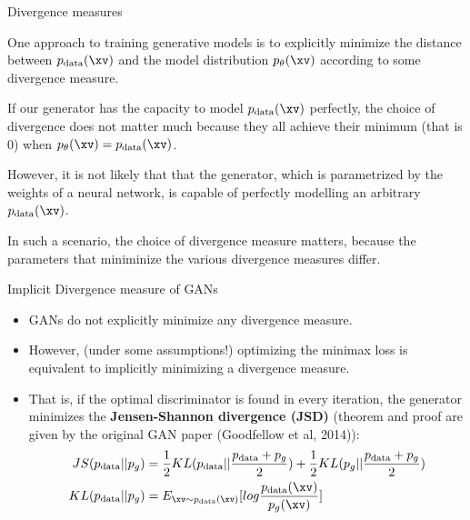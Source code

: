 \begin{frame} {Divergence measures}
  \begin{itemize}
    \small{\item One approach to training generative models is to explicitly minimize the distance between $p_{\text{data}}(\xv)$ and the model distribution $p_{\theta}(\xv)$ according to some divergence measure.
    \vspace{2mm}
    \item If our generator has the capacity to model $p_{\text{data}}(\xv)$ perfectly, the choice of divergence does not matter much because they all achieve their minimum (that is 0) when $p_{\theta}(\xv) = p_{\text{data}}(\xv)$.
    \vspace{2mm}
    \item However, it is not likely that that the generator, which is  parametrized by the weights of a neural network, is capable of perfectly modelling an arbitrary $ p_{\text{data}}(\xv)$.
    \vspace{2mm}
    \item In such a scenario, the choice of divergence measure matters, because the parameters that miniminize the various divergence measures differ.}
  \end{itemize}
\end{frame}

\begin{frame} {Implicit Divergence measure of GANs}
  \begin{itemize}
   \item GANs do not explicitly minimize any divergence measure.
   \item However, (under some assumptions!) optimizing the minimax loss is equivalent to implicitly minimizing a divergence measure.
    \item That is, if the optimal discriminator is found in every iteration,  the generator minimizes %
    the  \textbf{Jensen-Shannon divergence  (JSD)} (theorem and proof are given by the original GAN paper (Goodfellow et al, 2014)):
    \begin{align*}
      JS(p_{\text{data}}||p_g) & =  \frac{1}{2} KL(p_{\text{data}}||\frac{p_{\text{data}}+p_g}{2}) + \frac{1}{2}  KL(p_g || \frac {p_{\text{data}} + p_g}{2}) \\
        KL(p_{\text{data}}||p_g) & = E_{\xv \sim p_{\text{data}}(\xv)}[log \frac {p_{\text{data}}(\xv)}{p_g(\xv)}]
    \end{align*}
  \end{itemize}
\end{frame}


